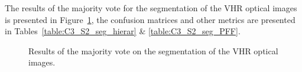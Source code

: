 The results of the majority vote for the segmentation of the VHR optical images is presented in Figure~\ref{fig:seg_im_sem}, the confusion matrices and other metrics are presented in Tables~\ref{table:C3_S2_seg_hierar} \& \ref{table:C3_S2_seg_PFF}.

\begin{figure}[htbp]
\begin{center}
\begingroup
\captionsetup[subfigure]{width=0.3\textwidth}
\hspace*{0.025\textwidth}
\hspace*{0.025\textwidth}
\endgroup
\caption{Results of the majority vote on the segmentation of the VHR optical images.}
\label{fig:seg_im_sem}
\end{center}
\end{figure}


